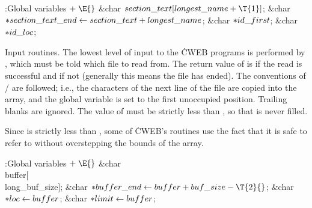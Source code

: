 \Y\B\4:Global variables\X${}\mathrel+\E{}$\6
\&{char} ${}\\{section\_text}[\\{longest\_name}+\T{1}]{}$;\6
\&{char} ${}{*}\\{section\_text\_end}\leftarrow\\{section\_text}+\\{longest\_name}{}$;%
\6
\&{char} ${}{*}\\{id\_first}{}$;\6
\&{char} ${}{*}\\{id\_loc}{}$;\par
\fi

Input routines.  The lowest level of input to the \.{CWEB} programs
is performed by , which must be told which file to read from.
The return value of  is  if the read is
successful and
 if not (generally this means the file has ended). The
conventions
of \TEX/ are followed; i.e., the characters of the next line of the file
are copied into the  array,
and the global variable  is set to the first unoccupied position.
Trailing blanks are ignored. The value of  must be strictly less
than , so that  is
never filled.

Since  is strictly less than ,
some of \.{CWEB}'s routines use the fact that it is safe to refer to
 without overstepping the bounds of the array.

\Y\B\4:Global variables\X${}\mathrel+\E{}$\6
\&{char} \\{buffer}[\\{long\_buf\_size}];\6
\&{char} ${}{*}\\{buffer\_end}\K\\{buffer}+\\{buf\_size}-\T{2}{}$;\6
\&{char} ${}{*}\\{loc}\leftarrow\\{buffer}{}$;\6
\&{char} ${}{*}\\{limit}\leftarrow\\{buffer}{}$;\par
\fi

